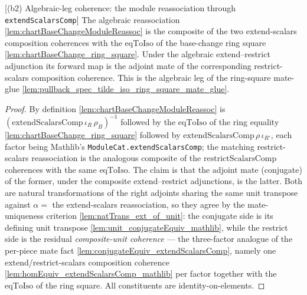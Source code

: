 \begin{lemma}

[(b2) Algebraic-leg coherence: the module reassociation through \texttt{extendScalarsComp}]
  \label{lem:chartBaseChangeModuleReassoc_extendScalarsComp}
  The algebraic reassociation \cref{lem:chartBaseChangeModuleReassoc} is the composite of the two
  extend-scalars composition coherences with the \(\mathrm{eqToIso}\) of the base-change ring square
  \cref{lem:chartBaseChange_ring_square}. Under the algebraic extend--restrict adjunction its forward
  map is the adjoint mate of the corresponding restrict-scalars composition coherence. This is the
  algebraic leg of the ring-square mate-glue
  \cref{lem:pullback_spec_tilde_iso_ring_square_mate_glue}.
  \begin{proof}
    By definition \cref{lem:chartBaseChangeModuleReassoc} is
    \((\mathrm{extendScalarsComp}\,\iota_R\,\rho_B)^{-1}\) followed by the \(\mathrm{eqToIso}\) of the
    ring equality \cref{lem:chartBaseChange_ring_square} followed by
    \(\mathrm{extendScalarsComp}\,\rho\,\iota_{R'}\), each factor being Mathlib's
    \texttt{ModuleCat.extendScalarsComp}; the matching restrict-scalars reassociation is the
    analogous composite of the \(\mathrm{restrictScalarsComp}\) coherences with the same
    \(\mathrm{eqToIso}\). The claim is that the adjoint mate (conjugate) of the former, under the
    composite extend--restrict adjunctions, is the latter. Both are natural transformations of the
    right adjoints sharing the same unit transpose against \(\alpha = \) the extend-scalars
    reassociation, so they agree by the mate-uniqueness criterion
    \cref{lem:natTrans_ext_of_unit}: the conjugate side is its defining unit transpose
    \cref{lem:unit_conjugateEquiv_mathlib}, while the restrict side is the residual
    \emph{composite-unit coherence} — the three-factor analogue of the per-piece mate fact
    \cref{lem:conjugateEquiv_extendScalarsComp}, namely one extend/restrict-scalars composition
    coherence \cref{lem:homEquiv_extendScalarsComp_mathlib} per factor together with the
    \(\mathrm{eqToIso}\) of the ring square. All constituents are identity-on-elements.

\end{proof}
\end{lemma}
